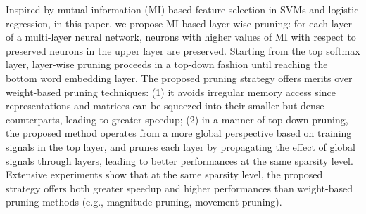 Inspired by mutual information (MI) based feature selection in SVMs and logistic regression, in this paper, we propose MI-based layer-wise pruning: for each layer of a multi-layer neural network, neurons with higher values of MI with respect to preserved neurons in the upper   layer are preserved. Starting from the top softmax layer, layer-wise pruning proceeds in a top-down fashion until reaching the bottom word embedding layer. The proposed pruning strategy offers  merits over weight-based pruning techniques: (1) it avoids irregular memory access since representations  and matrices can be squeezed into their smaller but dense counterparts, leading to  greater speedup; (2) in a manner of top-down pruning, the proposed method operates from a more global perspective based on training signals in the top layer, and prunes each layer by propagating the effect of global signals through  layers, leading to better performances at the same sparsity level. Extensive experiments show that at the same sparsity level, the proposed  strategy offers both greater speedup and higher performances than  weight-based pruning methods (e.g., magnitude pruning, movement pruning).
